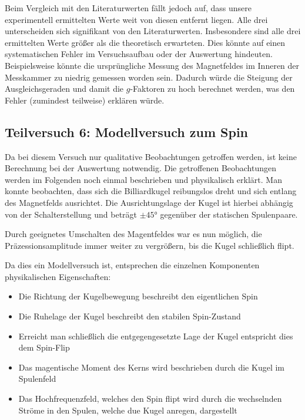 \documentclass{article}
\begin{document}
Beim Vergleich mit den Literaturwerten fällt jedoch auf, dass unsere experimentell
ermittelten Werte weit von diesen entfernt liegen. Alle drei unterscheiden sich
signifikant von den Literaturwerten.
Insbesondere sind alle drei ermittelten Werte größer als die theoretisch erwarteten.
Dies könnte auf einen systematischen Fehler im Versuchsaufbau oder der Auswertung
hindeuten. Beispielsweise könnte die ursprüngliche Messung des Magnetfeldes
im Inneren der Messkammer zu niedrig gemessen worden sein.
Dadurch würde die Steigung der Ausgleichsgeraden und damit die $g$-Faktoren
zu hoch berechnet werden, was den Fehler (zumindest teilweise) erklären würde.


\newpage

\subsection{Teilversuch 6: Modellversuch zum Spin}

Da bei diesem Versuch nur qualitative Beobachtungen getroffen werden, ist keine Berechnung bei der Auswertung notwendig. Die getroffenen Beobachtungen werden im Folgenden noch einmal beschrieben und physikalisch erklärt. Man konnte beobachten, dass sich die Billiardkugel reibungslos dreht und sich entlang des Magnetfelds ausrichtet. Die Ausrichtungslage der Kugel ist hierbei abhängig von der Schalterstellung und beträgt $\pm\ang{45}$ gegenüber der statischen Spulenpaare. 

Durch geeignetes Umschalten des Magentfeldes war es nun möglich, die Präzessionsamplitude immer weiter zu vergrößern, bis die Kugel schließlich flipt.

Da dies ein Modellversuch ist, entsprechen die einzelnen Komponenten physikalischen Eigenschaften:
\begin{itemize}
    \item Die Richtung der Kugelbewegung beschreibt den eigentlichen Spin
    \item Die Ruhelage der Kugel beschreibt den stabilen Spin-Zustand
    \item Erreicht man schließlich die entgegengesetzte Lage der Kugel entspricht dies dem Spin-Flip
    \item Das magentische Moment des Kerns wird beschrieben durch die Kugel im Spulenfeld
    \item Das Hochfrequenzfeld, welches den Spin flipt wird durch die wechselnden Ströme in den Spulen, welche due Kugel anregen, dargestellt
\end{itemize}
\end{document}
